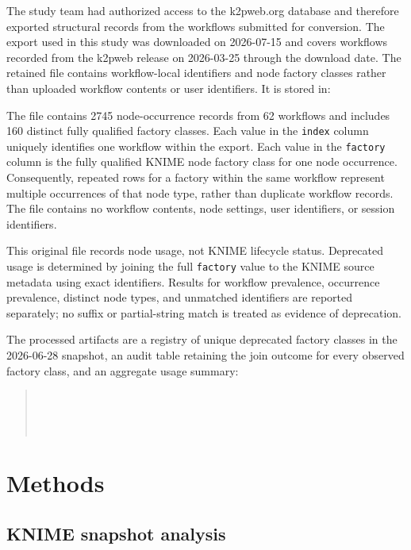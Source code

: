 \documentclass[runningheads]{llncs}
\begin{document}
The study team had authorized access to the k2pweb.org database and therefore
exported structural records from the workflows submitted for
conversion. The export used in this study was downloaded on 2026-07-15 and
covers workflows recorded from the k2pweb release on 2026-03-25 through the
download date. The retained file contains workflow-local identifiers and node
factory classes rather than uploaded workflow contents or user identifiers. It
is stored in:
\begin{quote}
\end{quote}
The file contains 2745 node-occurrence records from 62 workflows
and includes 160 distinct fully qualified factory classes. Each value in the
\texttt{index} column uniquely identifies one workflow within the
export. Each value in the \texttt{factory} column is the fully qualified KNIME
node factory class for one node occurrence. Consequently, repeated rows for a
factory within the same workflow represent multiple occurrences of that node
type, rather than duplicate workflow records. The file contains no workflow
contents, node settings, user identifiers, or session identifiers.

This original file records node usage, not KNIME lifecycle status. Deprecated
usage is determined by joining the full \texttt{factory} value to the KNIME
source metadata using exact identifiers. Results for workflow prevalence,
occurrence prevalence, distinct node types, and unmatched identifiers are
reported separately; no suffix or partial-string match is treated as evidence of
deprecation.

The processed artifacts are a registry of unique deprecated factory classes in
the 2026-06-28 snapshot, an audit table retaining the join outcome for every
observed factory class, and an aggregate usage summary:
\begin{quote}
\\
\\
\\
\end{quote}

\section{Methods}

\subsection{KNIME snapshot analysis}
\end{document}
